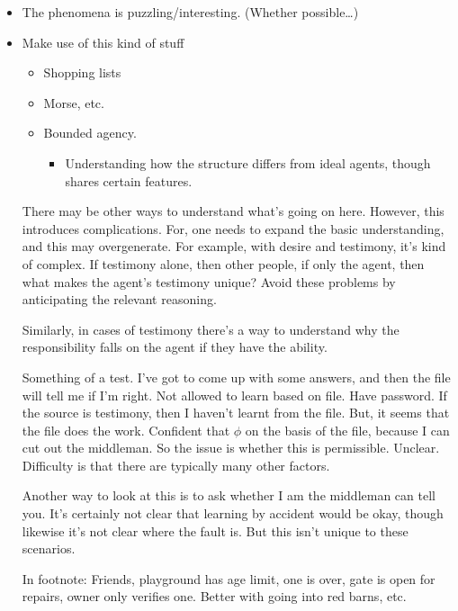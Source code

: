 \documentclass[10pt]{article}
\begin{document}
\begin{itemize}
\item The phenomena is puzzling/interesting. (Whether possible\dots)
\item Make use of this kind of stuff
  \begin{itemize}
  \item Shopping lists
  \item Morse, etc.
  \item Bounded agency.
    \begin{itemize}
    \item Understanding how the structure differs from ideal agents, though shares certain features.
    \end{itemize}
  \end{itemize}
  There may be other ways to understand what's going on here.
  However, this introduces complications.
  For, one needs to expand the basic understanding, and this may overgenerate.
  For example, with desire and testimony, it's kind of complex.
  If testimony alone, then other people, if only the agent, then what makes the agent's testimony unique?
  Avoid these problems by anticipating the relevant reasoning.

  Similarly, in cases of testimony there's a way to understand why the responsibility falls on the agent if they have the ability.
  \begin{scenario}
    Something of a test.
    I've got to come up with some answers, and then the file will tell me if I'm right.
    Not allowed to learn based on file.
    Have password.
    If the source is testimony, then I haven't learnt from the file.
    But, it seems that the file does the work.
    Confident that \(\phi\) on the basis of the file, because I can cut out the middleman.
    So the issue is whether this is permissible.
    Unclear.
    Difficulty is that there are typically many other factors.

    Another way to look at this is to ask whether I am the middleman can tell you.
    It's certainly not clear that learning by accident would be okay, though likewise it's not clear where the fault is.
    But this isn't unique to these scenarios.

    In footnote:
    Friends, playground has age limit, one is over, gate is open for repairs, owner only verifies one.
    Better with going into red barns, etc.
  \end{scenario}
\end{itemize}
\end{document}
